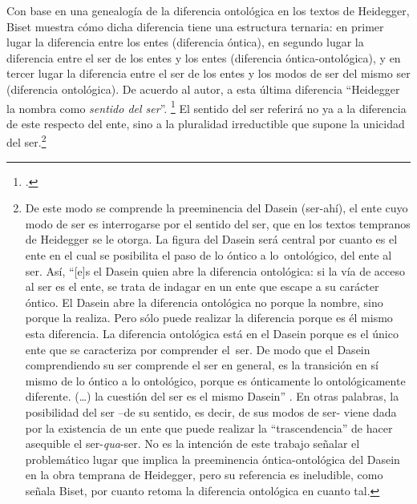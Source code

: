Con base en una genealogía de la diferencia ontológica en los textos de Heidegger, Biset muestra cómo dicha diferencia tiene una estructura ternaria: en primer lugar la diferencia entre los entes (diferencia óntica), en segundo lugar la diferencia entre el ser de los entes y los entes (diferencia óntica-ontológica), y en tercer lugar la diferencia entre el ser de los entes y los modos de ser del mismo ser (diferencia ontológica). De acuerdo al autor, a esta última diferencia \enquote{Heidegger la nombra como \emph{sentido del ser}}. \footcite[185]{@7074-BISET2010} El sentido del ser referirá no ya a la diferencia de este respecto del ente, sino a la pluralidad irreductible que supone la unicidad del ser.\footnote{De este modo se comprende la preeminencia del Dasein (ser-ahí), el ente cuyo modo de ser es interrogarse por el sentido del ser, que en los textos tempranos de Heidegger se le otorga. La figura del Dasein será central por cuanto es el ente en el cual se posibilita el paso de lo óntico a lo~ontológico, del ente al ser. Así, “[e]s el Dasein quien abre la diferencia ontológica: si la vía de acceso al ser es el ente, se trata de indagar en un ente que escape a su carácter óntico. El Dasein abre la diferencia ontológica no porque la nombre, sino porque la realiza. Pero sólo puede realizar la diferencia porque es él mismo esta diferencia. La diferencia ontológica está en el Dasein porque es el único ente que se caracteriza por comprender el~ser. De modo que el Dasein comprendiendo su ser comprende el ser en general, es la transición en sí mismo de lo óntico a lo ontológico, porque es ónticamente lo ontológicamente diferente. (\ldots) la cuestión del ser es el mismo Dasein” \parencite[186]{@7074-BISET2010}. En otras palabras, la posibilidad del ser --de su sentido, es decir, de sus modos de ser- viene dada por la existencia de un ente que puede realizar la \enquote{trascendencia} de hacer asequible el ser-\textit{qua}-ser. No es la intención de este trabajo señalar el problemático lugar que implica la preeminencia óntica-ontológica del Dasein en la obra temprana de Heidegger, pero su referencia es ineludible, como señala Biset, por cuanto retoma la diferencia ontológica en cuanto tal.}

